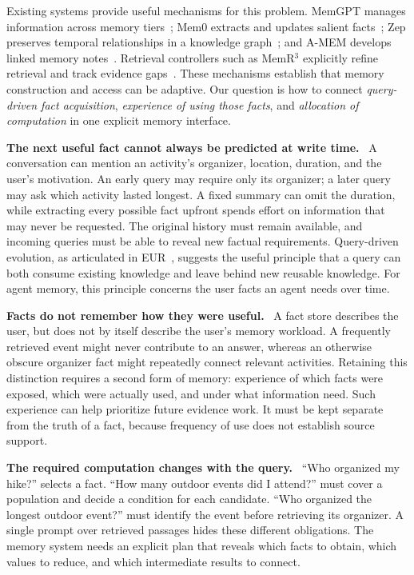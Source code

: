 \documentclass[10pt,twocolumn]{article}
\newcommand{\runin}[1]{\smallskip\noindent\textbf{#1.}\ }
\begin{document}
Existing systems provide useful mechanisms for this problem. MemGPT
manages information across memory tiers~\cite{memgpt}; Mem0 extracts and
updates salient facts~\cite{mem0}; Zep preserves temporal relationships
in a knowledge graph~\cite{zep}; and A-MEM develops linked memory
notes~\cite{amem}. Retrieval controllers such as MemR$^3$ explicitly
refine retrieval and track evidence gaps~\cite{memr3}. These mechanisms
establish that memory construction and access can be adaptive. Our
question is how to connect \emph{query-driven fact acquisition},
\emph{experience of using those facts}, and \emph{allocation of
computation} in one explicit memory interface.

\runin{The next useful fact cannot always be predicted at write time}
A conversation can mention an activity's organizer, location, duration,
and the user's motivation. An early query may require only its
organizer; a later query may ask which activity lasted longest. A fixed
summary can omit the duration, while extracting every possible fact
upfront spends effort on information that may never be requested.
The original history must remain available, and incoming queries must
be able to reveal new factual requirements. Query-driven evolution,
as articulated in EUR~\cite{eur}, suggests the useful principle that
a query can both consume existing knowledge and leave behind new
reusable knowledge. For agent memory, this principle concerns the
user facts an agent needs over time.

\runin{Facts do not remember how they were useful}
A fact store describes the user, but does not by itself describe the
user's memory workload. A frequently retrieved event might never
contribute to an answer, whereas an otherwise obscure organizer fact
might repeatedly connect relevant activities. Retaining this distinction
requires a second form of memory: experience of which facts were
exposed, which were actually used, and under what information need.
Such experience can help prioritize future evidence work. It must be
kept separate from the truth of a fact, because frequency of use does
not establish source support.

\runin{The required computation changes with the query}
``Who organized my hike?'' selects a fact. ``How many outdoor events
did I attend?'' must cover a population and decide a condition for each
candidate. ``Who organized the longest outdoor event?'' must identify
the event before retrieving its organizer. A single prompt over
retrieved passages hides these different obligations. The memory
system needs an explicit plan that reveals which facts to obtain,
which values to reduce, and which intermediate results to connect.
\end{document}
